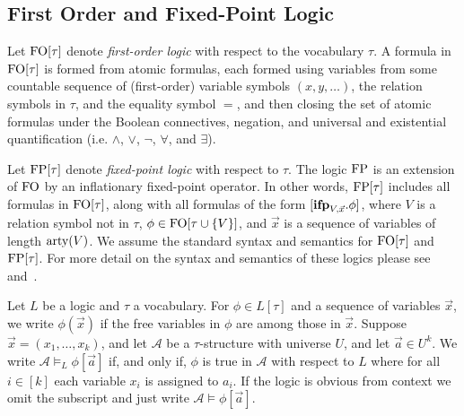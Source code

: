 \documentclass[../paper.tex]{subfiles}
\begin{document}
\subsection{First Order and Fixed-Point Logic}
Let $\text{\upshape FO}[\tau]$ denote \emph{first-order logic} with respect to the vocabulary
$\tau$. A formula in $\text{\upshape FO}[\tau]$ is formed from atomic formulas, each formed
using variables from some countable sequence of (first-order) variable symbols
$(x, y, \ldots)$, the relation symbols in $\tau$, and the equality symbol $=$,
and then closing the set of atomic formulas under the Boolean connectives,
negation, and universal and existential quantification (i.e. $\land$, $\lor$,
$\neg$, $\forall$, and $\exists$).

Let $\text{\upshape FP}[\tau]$ denote \emph{fixed-point logic} with respect to $\tau$. The
logic $\text{\upshape FP}$ is an extension of $\text{\upshape FO}$ by an inflationary fixed-point operator. In
other words, $\text{\upshape FP}[\tau]$ includes all formulas in $\text{\upshape FO}[\tau]$, along with all
formulas of the form $[\text{\textbf{ifp}}_{V, \vec{x}}. \phi]$, where $V$ is a relation symbol
not in $\tau$, $\phi \in \text{\upshape FO}[\tau \cup \{V\}]$, and $\vec{x}$ is a sequence of
variables of length $\mathrm{arty}(V)$. We assume the standard syntax and semantics for
$\text{\upshape FO}[\tau]$ and $\text{\upshape FP}[\tau]$. For more detail on the syntax and semantics of
these logics please see~\cite{grohe2017descriptive} and~\cite{GradelP15a}.

Let $L$ be a logic and $\tau$ a vocabulary. For $\phi \in L[\tau]$ and a
sequence of variables $\vec{x}$, we write $\phi(\vec{x})$ if the free variables
in $\phi$ are among those in $\vec{x}$. Suppose $\vec{x} = (x_1, \ldots , x_k)$,
and let $\mathcal{A}$ be a $\tau$-structure with universe $U$, and let $\vec{a}
\in U^k$. We write $\mathcal{A} \models_L \phi[\vec{a}]$ if, and only if, $\phi$
is true in $\mathcal{A}$ with respect to $L$ where for all $i \in [k]$ each
variable $x_i$ is assigned to $a_i$. If the logic is obvious from context we
omit the subscript and just write $\mathcal{A} \models \phi[\vec{a}]$.
\end{document}
